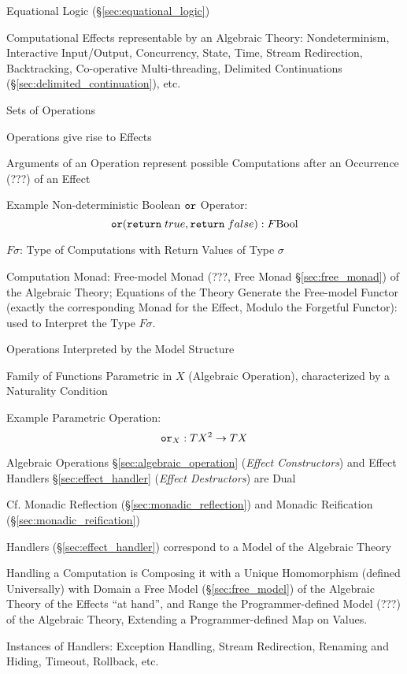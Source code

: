 Equational Logic (\S\ref{sec:equational_logic})

Computational Effects representable by an Algebraic Theory:
Nondeterminism, Interactive Input/Output, Concurrency, State, Time,
Stream Redirection, Backtracking, Co-operative Multi-threading,
Delimited Continuations (\S\ref{sec:delimited_continuation}), etc.

Sets of Operations

Operations give rise to Effects

Arguments of an Operation represent possible Computations after an
Occurrence (???) of an Effect

Example Non-deterministic Boolean $\mathtt{or}$ Operator:
\[
  \mathtt{or}(\mathtt{return}\;true, \mathtt{return}\;false)
  : F \mathrm{Bool}
\]

$F \sigma$: Type of Computations with Return Values of Type $\sigma$

Computation Monad: Free-model Monad (???, Free Monad
\S\ref{sec:free_monad}) of the Algebraic Theory; Equations of the
Theory Generate the Free-model Functor (exactly the corresponding
Monad for the Effect, Modulo the Forgetful Functor): used to Interpret
the Type $F \sigma$.

Operations Interpreted by the Model Structure

Family of Functions Parametric in $X$ (Algebraic Operation),
characterized by a Naturality Condition %

Example Parametric Operation:
\[
  \mathtt{or}_X : T X^2 \rightarrow T X
\]

Algebraic Operations \S\ref{sec:algebraic_operation} (\emph{Effect
  Constructors}) and Effect Handlers \S\ref{sec:effect_handler}
(\emph{Effect Destructors}) are Dual

\fist Cf. Monadic Reflection (\S\ref{sec:monadic_reflection})
and Monadic Reification (\S\ref{sec:monadic_reification})

Handlers (\S\ref{sec:effect_handler}) correspond to a Model of the
Algebraic Theory

Handling a Computation is Composing it with a Unique Homomorphism
(defined Universally) with Domain a Free Model
(\S\ref{sec:free_model}) of the Algebraic Theory of the Effects ``at
hand'', and Range the Programmer-defined Model (???) of the Algebraic
Theory, Extending a Programmer-defined Map on Values.

Instances of Handlers: Exception Handling, Stream Redirection,
Renaming and Hiding, Timeout, Rollback, etc.

